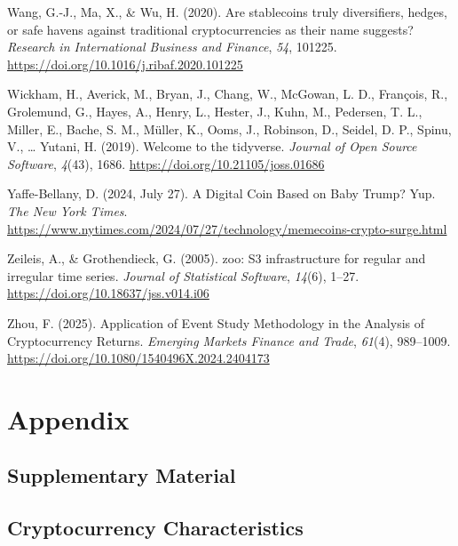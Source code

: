 \documentclass[
  12pt,
  a4paper,
  openany]{scrbook}
\newlength{\cslhangindent}
\newenvironment{CSLReferences}[2] %
 {\begin{list}{}{%
  \setlength{\itemindent}{0pt}
  \setlength{\leftmargin}{0pt}
  \setlength{\parsep}{0pt}
  \ifodd #1
   \setlength{\leftmargin}{\cslhangindent}
   \setlength{\itemindent}{-1\cslhangindent}
  \fi
  \setlength{\itemsep}{#2\baselineskip}}}
 {\end{list}}
\begin{document}
\begin{CSLReferences}{1}{0}
Wang, G.-J., Ma, X., \& Wu, H. (2020). Are stablecoins truly
diversifiers, hedges, or safe havens against traditional
cryptocurrencies as their name suggests? \emph{Research in International
Business and Finance}, \emph{54}, 101225.
\url{https://doi.org/10.1016/j.ribaf.2020.101225}

Wickham, H., Averick, M., Bryan, J., Chang, W., McGowan, L. D.,
François, R., Grolemund, G., Hayes, A., Henry, L., Hester, J., Kuhn, M.,
Pedersen, T. L., Miller, E., Bache, S. M., Müller, K., Ooms, J.,
Robinson, D., Seidel, D. P., Spinu, V., \ldots{} Yutani, H. (2019).
Welcome to the {tidyverse}. \emph{Journal of Open Source Software},
\emph{4}(43), 1686. \url{https://doi.org/10.21105/joss.01686}

Yaffe-Bellany, D. (2024, July 27). A Digital Coin Based on Baby Trump?
Yup. \emph{The New York Times}.
\url{https://www.nytimes.com/2024/07/27/technology/memecoins-crypto-surge.html}

Zeileis, A., \& Grothendieck, G. (2005). {zoo}: S3 infrastructure for
regular and irregular time series. \emph{Journal of Statistical
Software}, \emph{14}(6), 1--27.
\url{https://doi.org/10.18637/jss.v014.i06}

Zhou, F. (2025). Application of Event Study Methodology in the Analysis
of Cryptocurrency Returns. \emph{Emerging Markets Finance and Trade},
\emph{61}(4), 989--1009.
\url{https://doi.org/10.1080/1540496X.2024.2404173}

\end{CSLReferences}

\cleardoublepage
{}
{}
\appendix

\chapter{Appendix}\label{appendix}

\section{Supplementary Material}\label{sec-app_material}

\section{Cryptocurrency Characteristics}\label{sec-app_characteristics}
\end{document}
